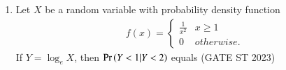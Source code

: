 \begin{enumerate}
\item Let $X$ be a random variable with probability density function
\begin{align}\
f(x) = \begin{cases}
\frac{1}{x^2} & x \geq 1 \\
0             & otherwise.
\end{cases}
\end{align}
If $Y = \log_e X$, then $\Pr\left(Y<1 | Y<2 \right)$ equals
\hfill(GATE ST 2023)\\
\solution

\end{enumerate}
